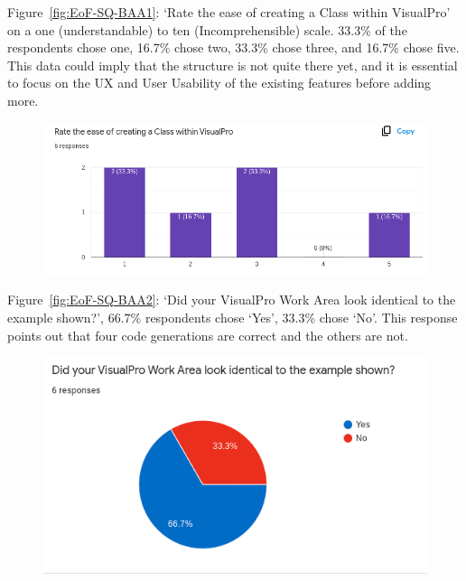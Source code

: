\documentclass[12pt]{report} %
\begin{document}
				Figure~\ref{fig:EoF-SQ-BAA1}: `Rate the ease of creating a Class within VisualPro' on a one (understandable) to ten (Incomprehensible) scale. 33.3\% of the respondents chose one, 16.7\% chose two, 33.3\% chose three, and 16.7\% chose five. This data could imply that the structure is not quite there yet, and it is essential to focus on the UX and User Usability of the existing features before adding more.

				\begin{figure}[H]
					{\includegraphics[scale=0.50]{Figures/VisualPro-Survey_Results/SQ-BAA1.png}}
				\end{figure}

				Figure~\ref{fig:EoF-SQ-BAA2}: `Did your VisualPro Work Area look identical to the example shown?', 66.7\% respondents chose `Yes', 33.3\% chose `No'. This response points out that four code generations are correct and the others are not.
				\begin{figure}[H]
					{\includegraphics[scale=0.50]{Figures/VisualPro-Survey_Results/SQ-BAA2.png}}
				\end{figure}
\end{document}

